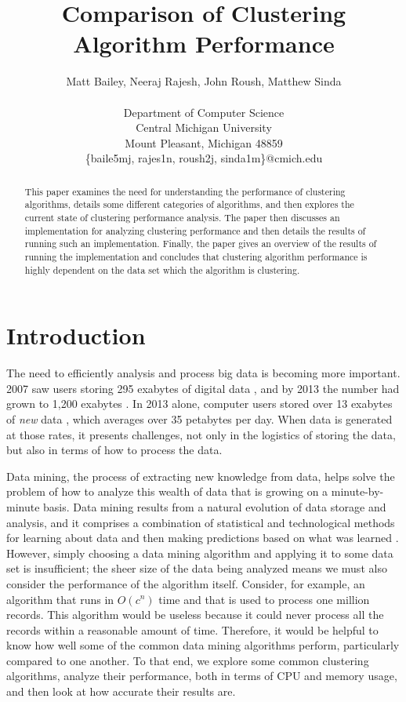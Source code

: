 \documentclass[11pt,letterpaper]{article}
\date{}
\title{\textbf{Comparison of Clustering Algorithm Performance}}
\author{Matt Bailey, Neeraj Rajesh, John Roush, Matthew Sinda \\
		\\
		Department of Computer Science \\
		Central Michigan University \\
		Mount Pleasant, Michigan  48859 \\
		\{baile5mj, rajes1n, roush2j, sinda1m\}@cmich.edu}
\begin{document}
\maketitle
\begin{abstract}
This paper examines the need for understanding the performance of clustering algorithms, details some different categories of algorithms, and then explores the current state of clustering performance analysis.  The paper then discusses an implementation for analyzing clustering performance and then details the results of running such an implementation.  Finally, the paper gives an overview of the results of running the implementation and concludes that clustering algorithm performance is highly dependent on the data set which the algorithm is clustering.
\end{abstract}

\section{Introduction}
The need to efficiently analysis and process big data is becoming more important.  2007 saw users storing 295 exabytes of digital data \cite{Hilbert}, and by 2013 the number had grown to 1,200 exabytes \cite{Lehikoinen}.  In 2013 alone, computer users stored over 13 exabytes of \textit{new} data \cite{Jagadish}, which averages over 35 petabytes per day.  When data is generated at those rates, it presents challenges, not only in the logistics of storing the data, but also in terms of how to process the data.

Data mining, the process of extracting new knowledge from data, helps solve the problem of how to analyze this wealth of data that is growing on a minute-by-minute basis.  Data mining results from a natural evolution of data storage and analysis, and it comprises a combination of statistical and technological methods for learning about data and then making predictions based on what was learned \cite{Han}.  However, simply choosing a data mining algorithm and applying it to some data set is insufficient; the sheer size of the data being analyzed means we must also consider the performance of the algorithm itself.  Consider, for example, an algorithm that runs in $O(c^n)$ time and that is used to process one million records.  This algorithm would be useless because it could never process all the records within a reasonable amount of time.  Therefore, it would be helpful to know how well some of the common data mining algorithms perform, particularly compared to one another.  To that end, we explore some common clustering algorithms, analyze their performance, both in terms of CPU and memory usage, and then look at how accurate their results are.
\end{document}
